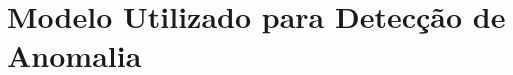 \section{Modelo Utilizado para Detecção de Anomalia}

\begin{comment}
Esse capítulo será responsável por dar uma base teórica a proposta. 
A ideia é que o leitor, com um breve conhecimento prévio, tenha a capacidade de ler esse material e consiga ter a capacidade de entender tecnicamente a proposta do projeto final.
Dependendo do assunto, poderá ter mais de uma área de resumo, podendo ficar cada uma em uma seção ou serem capítulos separados.

No caso de um único capítulo, deverá ter um breve resumo antes de iniciar a seção explicando o que este capítulo fará. Caso seja capítulo separado, poderá introduzir a área diretamente sem a criação de uma seção ou criar uma seção chamada "Introdução" e o nome do capítulo pode ser o nome da área.
\end{comment}
